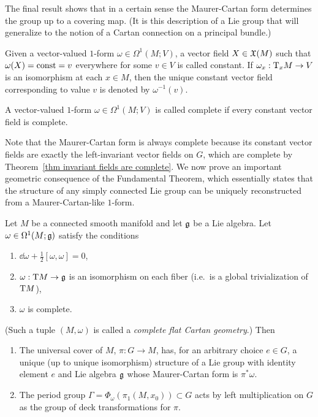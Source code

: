 The final result shows that in a certain sense the Maurer-Cartan form determines the group up to a covering map. (It is this description of a Lie group that will generalize to the notion of a Cartan connection on a principal bundle.)

\begin{defn}\label{def constant vector field}
    Given a vector-valued $1$-form $\omega\in\Omega^1(M;V)$, a vector field $X\in\mathfrak{X}(M)$ such that $\omega(X)=\mathrm{const}=v$ everywhere for some $v\in V$ is called constant. If $\omega_x:\mathrm{T}_x M\to V$ is an isomorphism at each $x\in M$, then the unique constant vector field corresponding to value $v$ is denoted by $\omega^{-1}(v)$.
\end{defn}
\begin{defn}\label{def complete form}
    A vector-valued $1$-form $\omega\in\Omega^1(M;V)$ is called complete if every constant vector field is complete.
\end{defn}

Note that the Maurer-Cartan form is always complete because its constant vector fields are exactly the left-invariant vector fields on $G$, which are complete by Theorem~\ref{thm invariant fields are complete}. We now prove an important geometric consequence of the Fundamental Theorem, which essentially states that the structure of any simply connected Lie group can be uniquely reconstructed from a Maurer-Cartan-like $1$-form.


\begin{thm}\label{thm 8.7 Sharpe}
    Let $M$ be a connected smooth manifold and let $\mathfrak{g}$ be a Lie algebra. Let $\omega\in\Omega^1(M;\mathfrak{g})$ satisfy the conditions
    \begin{enumerate}[label=(\roman*)]
        \item $\dd\omega+\frac12[\omega,\omega]=0$,
        \item $\omega:\mathrm{T} M\to \mathfrak{g}$ is an isomorphism on each fiber (i.e.\ is a global trivialization of $\mathrm{T} M$),
        \item $\omega$ is complete.
    \end{enumerate}
    (Such a tuple $(M,\omega)$ is called a \emph{complete flat Cartan geometry}.)
    Then
    \begin{enumerate}[label=(\alph*)]
        \item The universal cover of $M$, $\pi:G\to M$, has, for an arbitrary choice $e\in G$, a unique (up to unique isomorphism) structure of a Lie group with identity element $e$ and Lie algebra $\mathfrak{g}$ whose Maurer-Cartan form is $\pi^\ast\omega$.
        \item The period group $\Gamma=\Phi_\omega(\pi_1(M,x_0))\subset G$ acts by left multiplication on $G$ as the group of deck transformations for $\pi$.
    \end{enumerate}
\end{thm}

